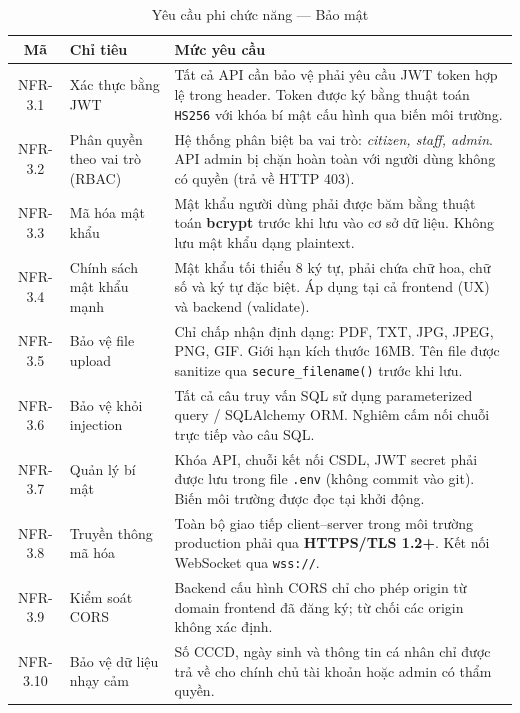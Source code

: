 \begin{table}[H]
\centering
\caption{Yêu cầu phi chức năng — Bảo mật}
\label{tab:nfr-sec}
\begin{tabularx}{\textwidth}{|c|l|X|}
\hline
\textbf{Mã} & \textbf{Chỉ tiêu} & \textbf{Mức yêu cầu} \\
\hline
NFR-3.1 & Xác thực bằng JWT &
  Tất cả API cần bảo vệ phải yêu cầu JWT token hợp lệ trong header.
  Token được ký bằng thuật toán \texttt{HS256} với khóa bí mật cấu hình
  qua biến môi trường. \\
\hline
NFR-3.2 & Phân quyền theo vai trò (RBAC) &
  Hệ thống phân biệt ba vai trò: \textit{citizen, staff, admin}.
  API admin bị chặn hoàn toàn với người dùng không có quyền
  (trả về HTTP 403). \\
\hline
NFR-3.3 & Mã hóa mật khẩu &
  Mật khẩu người dùng phải được băm bằng thuật toán \textbf{bcrypt}
  trước khi lưu vào cơ sở dữ liệu. Không lưu mật khẩu dạng plaintext. \\
\hline
NFR-3.4 & Chính sách mật khẩu mạnh &
  Mật khẩu tối thiểu 8 ký tự, phải chứa chữ hoa, chữ số và ký tự đặc biệt.
  Áp dụng tại cả frontend (UX) và backend (validate). \\
\hline
NFR-3.5 & Bảo vệ file upload &
  Chỉ chấp nhận định dạng: PDF, TXT, JPG, JPEG, PNG, GIF.
  Giới hạn kích thước 16MB. Tên file được sanitize qua
  \texttt{secure\_filename()} trước khi lưu. \\
\hline
NFR-3.6 & Bảo vệ khỏi injection &
  Tất cả câu truy vấn SQL sử dụng parameterized query / SQLAlchemy ORM.
  Nghiêm cấm nối chuỗi trực tiếp vào câu SQL. \\
\hline
NFR-3.7 & Quản lý bí mật &
  Khóa API, chuỗi kết nối CSDL, JWT secret phải được lưu trong file
  \texttt{.env} (không commit vào git). Biến môi trường được đọc tại
  khởi động. \\
\hline
NFR-3.8 & Truyền thông mã hóa &
  Toàn bộ giao tiếp client–server trong môi trường production
  phải qua \textbf{HTTPS/TLS 1.2+}. Kết nối WebSocket qua \texttt{wss://}. \\
\hline
NFR-3.9 & Kiểm soát CORS &
  Backend cấu hình CORS chỉ cho phép origin từ domain frontend
  đã đăng ký; từ chối các origin không xác định. \\
\hline
NFR-3.10 & Bảo vệ dữ liệu nhạy cảm &
  Số CCCD, ngày sinh và thông tin cá nhân chỉ được trả về
  cho chính chủ tài khoản hoặc admin có thẩm quyền. \\
\hline
\end{tabularx}
\end{table}


